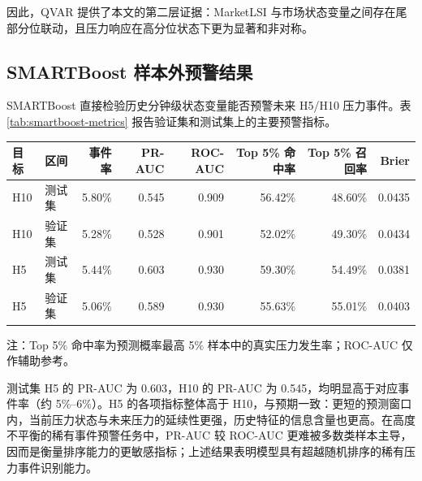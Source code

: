 \documentclass[12pt,a4paper]{ctexart}
\begin{document}
因此，QVAR 提供了本文的第二层证据：MarketLSI 与市场状态变量之间存在尾部分位联动，且压力响应在高分位状态下更为显著和非对称。


\subsection{SMARTBoost 样本外预警结果}
\label{subsec:smartboost-results}

SMARTBoost 直接检验历史分钟级状态变量能否预警未来 H5/H10 压力事件。表 \ref{tab:smartboost-metrics} 报告验证集和测试集上的主要预警指标。

\begin{center}
\begingroup
\captionsetup{type=table}
\begin{minipage}{\textwidth}
\centering
{}
\label{tab:smartboost-metrics}
\scriptsize
\setlength{\tabcolsep}{3.8pt}
\begin{threeparttable}
\begin{tabular}{llrrrrrr}
\toprule
目标 & 区间 & 事件率 & PR-AUC & ROC-AUC & Top 5\% 命中率 & Top 5\% 召回率 & Brier \\
\midrule
H10 & 测试集 & 5.80\% & 0.545 & 0.909 & 56.42\% & 48.60\% & 0.0435 \\
H10 & 验证集 & 5.28\% & 0.528 & 0.901 & 52.02\% & 49.30\% & 0.0434 \\
H5 & 测试集 & 5.44\% & 0.603 & 0.930 & 59.30\% & 54.49\% & 0.0381 \\
H5 & 验证集 & 5.06\% & 0.589 & 0.930 & 55.63\% & 55.01\% & 0.0403 \\
\bottomrule
\end{tabular}
\begin{tablenotes}[flushleft]
\footnotesize
\item 注：Top 5\% 命中率为预测概率最高 5\% 样本中的真实压力发生率；ROC-AUC 仅作辅助参考。
\end{tablenotes}
\end{threeparttable}
\end{minipage}
\endgroup
\end{center}

测试集 H5 的 PR-AUC 为 0.603，H10 的 PR-AUC 为 0.545，均明显高于对应事件率（约 5\%--6\%）。H5 的各项指标整体高于 H10，与预期一致：更短的预测窗口内，当前压力状态与未来压力的延续性更强，历史特征的信息含量也更高。在高度不平衡的稀有事件预警任务中，PR-AUC 较 ROC-AUC 更难被多数类样本主导，因而是衡量排序能力的更敏感指标；上述结果表明模型具有超越随机排序的稀有压力事件识别能力。
\end{document}
